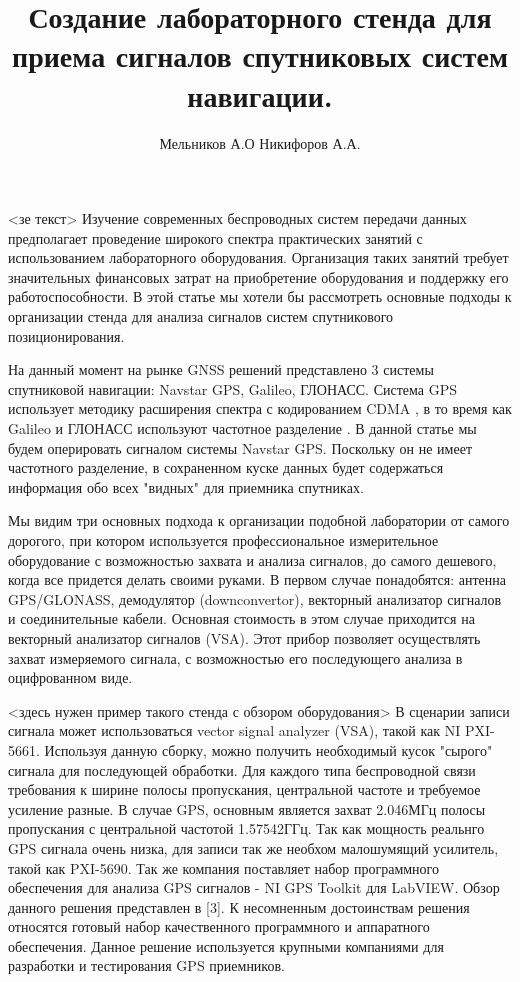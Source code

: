 \documentclass[a4paper,12pt]{article}
\numberwithin{equation}{section}		%
\numberwithin{table}{section}
\begin{document}
\title{Создание лабораторного стенда для приема сигналов спутниковых систем навигации.}
\author{Мельников А.О Никифоров А.А.}

\maketitle

<зе текст>
Изучение современных беспроводных систем передачи данных предполагает проведение широкого спектра практических занятий с использованием лабораторного оборудования.
Организация таких занятий требует значительных финансовых затрат на приобретение оборудования и поддержку его работоспособности. В этой статье мы хотели бы
рассмотреть основные подходы к организации стенда для анализа сигналов систем спутникового позиционирования.

На данный момент на рынке GNSS решений представлено 3 системы спутниковой навигации: Navstar GPS, Galileo, ГЛОНАСС. Система GPS использует методику расширения
спектра с кодированием CDMA \cite{gpsuserequipment}, в то время как Galileo и ГЛОНАСС используют частотное разделение \cite{galileo}. В данной статье мы будем оперировать
сигналом системы Navstar GPS. Поскольку он не имеет частотного разделение, в сохраненном куске данных будет содержаться информация обо всех "видных" для приемника спутниках.
 
Мы видим три основных подхода к организации подобной лаборатории от самого дорогого, при котором используется профессиональное измерительное оборудование с возможностью
захвата и анализа сигналов, до самого дешевого, когда все придется делать своими руками. В первом случае понадобятся: антенна GPS/GLONASS, демодулятор (downconvertor),
векторный анализатор сигналов и соединительные кабели. Основная стоимость в этом случае приходится на векторный анализатор сигналов (VSA). Этот прибор позволяет
осуществлять захват измеряемого сигнала, с возможностью его последующего анализа в оцифрованном виде.

<здесь нужен пример такого стенда с обзором оборудования>
В сценарии записи сигнала может использоваться vector signal analyzer (VSA), такой как NI PXI-5661. Используя данную сборку, можно получить необходимый кусок "сырого"
сигнала для последующей обработки. Для каждого типа беспроводной связи требования к ширине полосы пропускания, центральной частоте и требуемое усиление разные. В
случае GPS, основным является захват 2.046МГц полосы пропускания с центральной частотой 1.57542ГГц. Так как мощность реальнго GPS сигнала очень низка, для записи
так же необхом малошумящий усилитель, такой как PXI-5690. Так же компания поставляет набор программного обеспечения для анализа  GPS сигналов - NI GPS Toolkit для
LabVIEW. Обзор данного решения представлен в [3]. К несомненным достоинствам решения относятся готовый набор качественного программного и аппаратного обеспечения.
Данное решение используется крупными компаниями для разработки и тестирования GPS приемников.
 
\end{document}
